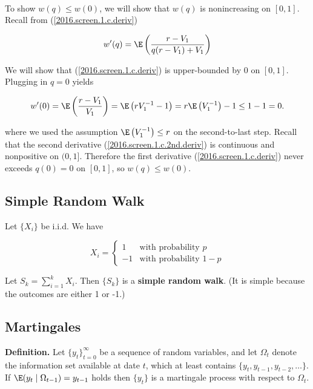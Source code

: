 \begin{solution}
\begin{enumerate}[(a)]
\

To show \(w(q) \leq w(0)\), we will show that \(w(q)\) is nonincreasing on \([0, 1]\). Recall from (\ref{2016.screen.1.c.deriv}) 

\[
w'(q) = \E  \left( \frac{r - V_1}{q(r - V_1) + V_1} \right)
\]

We will show that (\ref{2016.screen.1.c.deriv}) is upper-bounded by 0 on \([0,1]\). Plugging in \(q = 0\) yields

\[
w'(0) = \E  \left( \frac{r - V_1}{ V_1} \right) = \E  \left( r V_1^{-1} - 1 \right)  = r \E  \left(V_1^{-1}\right)  - 1 \leq 1 - 1 = 0.
\]

where we used the assumption \(\E\left(V_1^{-1}\right)  \leq r\) on the second-to-last step. Recall that the second derivative (\ref{2016.screen.1.c.2nd.deriv}) is continuous and nonpositive on \((0,1]\). Therefore the first derivative (\ref{2016.screen.1.c.deriv}) never exceeds \(q(0) = 0\) on \([0,1]\), so \(w(q) \leq w(0)\).


\end{enumerate}

\end{solution}



\subsection{Simple Random Walk}

\begin{definition}\label{sp.srw} Let \(\{X_i\}\) be i.i.d. We have

\[
X_i = \begin{cases}
1 & \text{with probability } p \\
-1 & \text{with probability } 1 - p
\end{cases}
\]

Let \(S_k = \sum_{i=1}^k X_i\). Then \(\{S_k\}\) is a \textbf{simple random walk}. (It is simple because the outcomes are either 1 or -1.)

\end{definition}

\subsection{Martingales}

\textbf{Definition.} Let \(\{y_t\}_{t=0}^\infty \) be a sequence of random variables, and let \(\Omega_t\) denote the information set available at date \(t\), which at least contains \(\{y_t, y_{t-1}, y_{t-2}, \ldots \}\). If \(\E(y_t \mid \Omega_{t-1}) = y_{t-1}\) holds then \(\{y_t\}\) is a martingale process with respect to \(\Omega_t\).

